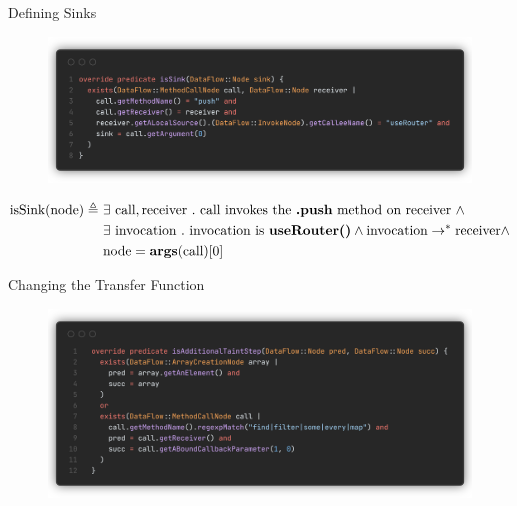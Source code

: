 \documentclass[aspectratio=169,xcolor=dvipsnames]{beamer}
\begin{document}
\begin{frame}{Defining Sinks}

	\begin{figure}
		\includegraphics[width=\textwidth]{img/5.png}
	\end{figure}
	\vspace{-1em}
	\begin{align*}
		\text{isSink}(\text{node}) \triangleq \  & \exists \ \text{call}, \text{receiver} \ .\   \text{call invokes the {\bf.push} method on receiver} \ \land                           \\
		                                         & \exists \ \text{invocation} \ .\   \text{invocation is {\bf useRouter()}} \land \text{invocation} \rightarrow^* \text{receiver} \land \\ \
		                                         & \text{node} = \text{{\bf args}(call)[0]}
	\end{align*}
\end{frame}

\begin{frame}{Changing the Transfer Function}

	\begin{figure}
		\includegraphics[width=\textwidth]{img/6.png}
	\end{figure}
\end{frame}
\end{document}
